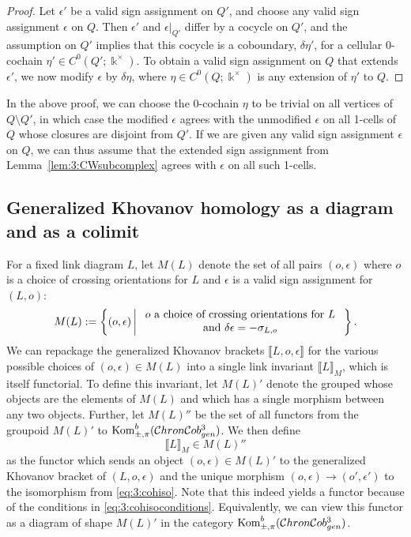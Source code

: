 \documentclass[12pt]{amsart}
\theoremstyle{definition}
\theoremstyle{plain}
\newcommand{\kombpmp}[1]{\textnormal{Kom}^b_{\pm,\pi}(#1)}
\begin{document}
\begin{proof} Let $\epsilon'$ be a valid sign assignment on $Q'$, and choose any valid sign assignment $\epsilon$ on $Q$. Then $\epsilon'$ and $\epsilon|_{Q'}$ differ by a cocycle on $Q'$,
and the assumption on $Q'$ implies that this cocycle is a coboundary, $\delta\eta'$, for a cellular $0$-cochain $\eta'\in C^0(Q';\Bbbk^\times)$.
To obtain a valid sign assignment on $Q$ that extends $\epsilon'$, we now modify $\epsilon$ by $\delta\eta$, where
$\eta\in C^0(Q;\Bbbk^\times)$ is any extension of $\eta'$ to $Q$.
\end{proof}

In the above proof, we can choose the 0-cochain $\eta$ to be trivial on all vertices of $Q\setminus Q'$,
in which case the modified $\epsilon$ agrees with the unmodified $\epsilon$ on
all 1-cells of $Q$ whose closures are disjoint from $Q'$. If we are given any valid sign assignment $\epsilon$ on $Q$, we can thus assume that the extended sign assignment from
Lemma~\ref{lem:3:CWsubcomplex} agrees with $\epsilon$ on all such 1-cells.

\subsection{Generalized Khovanov homology as a diagram and as a colimit}\label{subs:colimit}

For a fixed link diagram $L$, let $M(L)$ denote the set of all pairs $(o,\epsilon)$
where $o$ is a choice of crossing orientations for $L$ and $\epsilon$ is a valid sign assignment for $(L,o)$:
\[
M(L):=\left\{(o,\epsilon)\,\middle\vert\,\parbox{2.55in}{\centering $o$ a choice of crossing orientations for $L$ and $\delta\epsilon=-\sigma_{L,o}$}\,\right\}.
\]
We can repackage the generalized Khovanov brackets $\llbracket L,o,\epsilon\rrbracket$
for the various possible choices of $(o,\epsilon)\in M(L)$
into a single link invariant $\llbracket L\rrbracket_M$,
which is itself functorial.
To define this invariant, let $M(L)'$ denote the grouped whose objects are the elements
of $M(L)$ and which has a single morphism between any two objects. Further, let $M(L)''$
be the set of all functors from
the groupoid $M(L)'$ to $\kombpmp{\mathcal{C}hron\mathcal{C}ob^3_{gen}}$. We then define
\[
\llbracket L\rrbracket_M\in M(L)''
\]
as the functor which sends an object $(o,\epsilon)\in M(L)'$ to the generalized
Khovanov bracket of $(L,o,\epsilon)$ and the unique morphism $(o,\epsilon)\rightarrow(o',\epsilon')$
to the isomorphism from \eqref{eq:3:cohiso}. Note that
this indeed yields a functor because of the conditions in \eqref{eq:3:cohisoconditions}.
Equivalently, we can view this functor as a diagram 
of shape $M(L)'$ in the category $\kombpmp{\mathcal{C}hron\mathcal{C}ob^3_{gen}}$.
\end{document}
